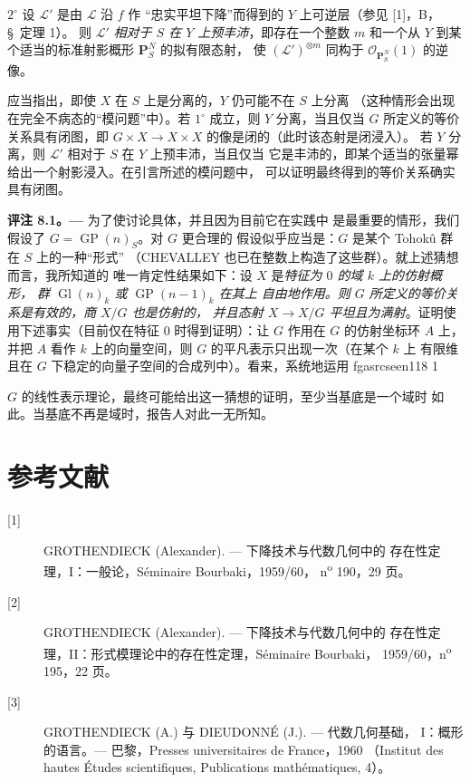 \documentclass[12pt,twoside,openany]{book}
\numberwithin{equation}{section}
\newcommand{\fgaunitid}{unbound}
\newcommand{\src}[1]{%
  \phantomsection
  \hypertarget{src:\fgaunitid:#1}{}%
  \hypertarget{fga.\fgaunitid.p#1}{}%
  \ifcsname fgasrcseen#1\endcsname\else
    \expandafter\gdef\csname fgasrcseen#1\endcsname{1}%
    \hypertarget{src:#1}{}%
  \fi
  \marginpar{\raggedleft\footnotesize\sffamily #1}%
}
\theoremstyle{plain}
\theoremstyle{definition}
\theoremstyle{remark}
\begin{document}
\smallskip
\noindent $2^\circ$ 设 $\mathcal L'$ 是由 $\mathcal L$ 沿 $f$ 作
“忠实平坦下降”而得到的 $Y$ 上可逆层（参见 [1]，B，\S~定理 1）。
则 $\mathcal L'$ \emph{相对于 $S$ 在 $Y$ 上预丰沛}，即存在一个整数
$m$ 和一个从 $Y$ 到某个适当的标准射影概形 $\mathbf P_S^N$ 的拟有限态射，
使 $(\mathcal L')^{\otimes m}$ 同构于
$\mathcal O_{\mathbf P_S^N}(1)$ 的逆像。

应当指出，即使 $X$ 在 $S$ 上是分离的，$Y$ 仍可能不在 $S$ 上分离
（这种情形会出现在完全不病态的“模问题”中）。若 $1^\circ$ 成立，则
$Y$ 分离，当且仅当 $G$ 所定义的等价关系具有闭图，即
$G\times X\to X\times X$ 的像是闭的（此时该态射是闭浸入）。
若 $Y$ 分离，则 $\mathcal L'$ 相对于 $S$ 在 $Y$ 上预丰沛，当且仅当
它是丰沛的，即某个适当的张量幂给出一个射影浸入。在引言所述的模问题中，
可以证明最终得到的等价关系确实具有闭图。

\medskip
\noindent\textbf{评注 8.1。---} 为了使讨论具体，并且因为目前它在实践中
是最重要的情形，我们假设了 $G=\operatorname{GP}(n)_S$。对 $G$ 更合理的
假设似乎应当是：$G$ 是某个 Tohokû 群在 $S$ 上的一种“形式”
（CHEVALLEY 也已在整数上构造了这些群）。就上述猜想而言，我所知道的
唯一肯定性结果如下：设 $X$ 是\emph{特征为 $0$ 的域 $k$ 上的仿射概形，
群 $\operatorname{Gl}(n)_k$ 或 $\operatorname{GP}(n-1)_k$ 在其上
自由地作用。则 $G$ 所定义的等价关系是有效的，商 $X/G$ 也是仿射的，
并且态射 $X\to X/G$ 平坦且为满射}。证明使用下述事实（目前仅在特征
$0$ 时得到证明）：让 $G$ 作用在 $G$ 的仿射坐标环 $A$ 上，并把 $A$
看作 $k$ 上的向量空间，则 $G$ 的平凡表示只出现一次（在某个 $k$ 上
有限维且在 $G$ 下稳定的向量子空间的合成列中）。看来，系统地运用
\src{118}
$G$ 的线性表示理论，最终可能给出这一猜想的证明，至少当基底是一个域时
如此。当基底不再是域时，报告人对此一无所知。

\section*{参考文献}

\begin{description}
\item[{[1]}] GROTHENDIECK (Alexander). --- 下降技术与代数几何中的
存在性定理，I：一般论，Séminaire Bourbaki，1959/60，
n\textsuperscript{o} 190，29 页。

\item[{[2]}] GROTHENDIECK (Alexander). --- 下降技术与代数几何中的
存在性定理，II：形式模理论中的存在性定理，Séminaire Bourbaki，
1959/60，n\textsuperscript{o} 195，22 页。

\item[{[3]}] GROTHENDIECK (A.) 与 DIEUDONNÉ (J.). --- 代数几何基础，
I：概形的语言。--- 巴黎，Presses universitaires de France，1960
（Institut des hautes Études scientifiques, Publications
mathématiques, 4）。
\end{description}
\end{document}
